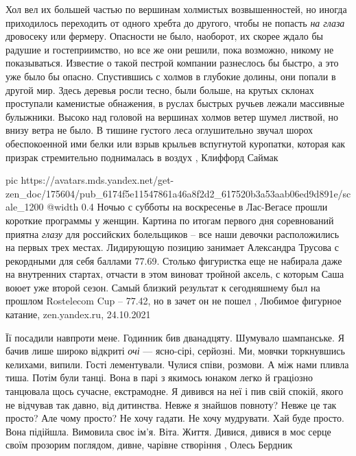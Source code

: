 Хол вел их большей частью по вершинам холмистых возвышенностей, но иногда
приходилось переходить от одного хребта до другого, чтобы не попасть \emph{на
глаза} дровосеку или фермеру. Опасности не было, наоборот, их скорее ждало бы
радушие и гостеприимство, но все же они решили, пока возможно, никому не
показываться.  Известие о такой пестрой компании разнеслось бы быстро, а это
уже было бы опасно.  Спустившись с холмов в глубокие долины, они попали в
другой мир. Здесь деревья росли тесно, были больше, на крутых склонах
проступали каменистые обнажения, в руслах быстрых ручьев лежали массивные
булыжники. Высоко над головой на вершинах холмов ветер шумел листвой, но внизу
ветра не было. В тишине густого леса оглушительно звучал шорох обеспокоенной
ими белки или взрыв крыльев вспугнутой куропатки, которая как призрак
стремительно поднималась в воздух
, Клиффорд Саймак

\ifcmt
  pic https://avatars.mds.yandex.net/get-zen_doc/175604/pub_6174f5e11547861a46a8f2d2_617520b3a53aab06ed9d891e/scale_1200
  @width 0.4
\fi
Ночью с субботы на воскресенье в Лас-Вегасе прошли короткие программы у женщин.
Картина по итогам первого дня соревнований приятна \emph{глазу} для российских
болельщиков – все наши девочки расположились на первых трех местах.
Лидирующую позицию занимает Александра Трусова с рекордными для себя баллами
77.69. Столько фигуристка еще не набирала даже на внутренних стартах, отчасти в
этом виноват тройной аксель, с которым Саша воюет уже второй сезон. Самый
близкий результат к сегодняшнему был на прошлом Rostelecom Cup – 77.42, но в
зачет он не пошел
, 
Любимое фигурное катание, zen.yandex.ru, 24.10.2021

Її посадили навпроти мене. Годинник бив дванадцяту. Шумувало шампанське. Я
бачив лише широко відкриті \emph{очі} — ясно-сірі, серйозні. Ми, мовчки
торкнувшись келихами, випили. Гості лементували. Чулися співи, розмови. А між
нами пливла тиша.  Потім були танці. Вона в парі з якимось юнаком легко й
граціозно танцювала щось сучасне, екстрамодне. Я дивився на неї і пив свій
спокій, якого не відчував так давно, від дитинства. Невже я знайшов повноту?
Невже це так просто?  Але чому просто? Не хочу гадати. Не хочу мудрувати.  Хай
буде просто.  Вона підійшла. Вимовила своє ім’я. Віта. Життя. Дивися, дивися в
моє серце своїм прозорим поглядом, дивне, чарівне створіння
, Олесь Бердник

